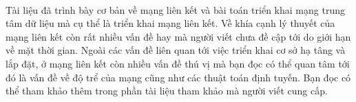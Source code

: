\documentclass[../report.tex]{subfiles}
\begin{document}
\paragraph*{}
Tài liệu đã trình bày cơ bản về mạng liên kết và bài toán triển khai mạng trung tâm dữ liệu mà cụ thể là triển khai mạng liên kết. Về khía cạnh lý thuyết của mạng liên kết còn rất nhiều vấn đề hay mà người viết chưa đề cập tới do giới hạn về mặt thời gian. Ngoài các vấn đề liên quan tới việc triển khai cơ sở hạ tâng và lắp đặt, ở mạng liên kết còn nhiều vấn đề thú vị mà bạn đọc có thể quan tâm tới đó là vấn đề về độ trể của mạng cũng như các thuật toán định tuyến. Bạn đọc có thể tham khảo thêm trong phần tài liệu tham khảo mà người viết cung cấp.
\end{document}
